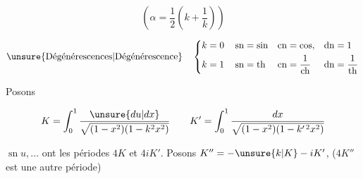 \[\left(\alpha=\frac12\left(k+\frac1k\right)\right)\]

\[
\text{\unsure{Dégénérescences|Dégénérescence}}\quad
\left\{\begin{aligned}
k=0&\quad\operatorname{sn}=\sin&\operatorname{cn}&=\cos,&\operatorname{dn}&=1\\
k=1&\quad\operatorname{sn}=\operatorname{th}&\operatorname{cn}&=\frac1{\operatorname{ch}}&\operatorname{dn}&=\frac1{\operatorname{th}}
\end{aligned}\right.
\]

\quad Posons

\[
K=\int_0^1\frac{\unsure{du|dx}}{\sqrt{(1-x^2)(1-k^2x^2)}}\qquad
K'=\int_0^1\frac{dx}{\sqrt{(1-x^2)(1-k'^{\,2}x^2)}}
\]

$\operatorname{sn}u,\ldots$ ont les périodes $4K$ et $4iK'$. Posons $K''=-\unsure{k|K}-iK'$, ($4K''$ est une autre période)

